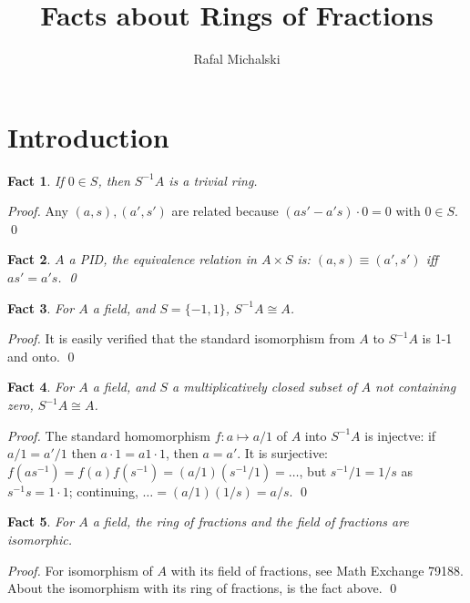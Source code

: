 \documentclass{article}
\title{Facts about Rings of Fractions}
\author{Rafal Michalski}
\date{}
\newtheorem{theorem}{Fact}[section]
\begin{document}
 

\maketitle

\section{Introduction}

\begin{theorem}
If $0 \in S$, then $S^{-1}A$ is a trivial ring.
\end{theorem}

\noindent
\textit{Proof.} Any $(a, s), (a', s')$ are related because $(as' - a's) \cdot 0 = 0$ with $0 \in S$. \qed

\begin{theorem}
$A$ a PID, the equivalence relation in $ A \times S $ is: $ (a, s) \equiv (a', s') $ iff $ as' = a's $. \qed
\end{theorem}


\vspace{2em}

\begin{theorem}
For $A$ a field, and $S = \{-1, 1\}$, $S^{-1}A \cong A$.
\end{theorem}

\noindent
\textit{Proof.} It is easily verified that the standard isomorphism from $A$ to $S^{-1}A$ is 1-1 and onto. \qed

\begin{theorem}
For $A$ a field, and $S$ a multiplicatively closed subset of $A$ not containing zero, $S^{-1}A \cong A$.
\end{theorem}

\noindent
\textit{Proof.} The standard homomorphism $f:a \mapsto a/1$ of $A$ into $S^{-1}A$ is injectve: if $a/1 = a'/1$ then $a \cdot 1 = a1 \cdot 1$, then $a = a'$. It is surjective: $f(as^{-1}) = f(a)f(s^{-1}) = (a/1)(s^{-1}/1) = \ldots$, but $s^{-1}/1 = 1/s$ as $s^{-1}s = 1 \cdot 1$; continuing, $\ldots = (a/1)(1/s) = a/s$. \qed

\begin{theorem}
For $A$ a field, the ring of fractions and the field of fractions are isomorphic.
\end{theorem}

\noindent
\textit{Proof.} For isomorphism of $A$ with its field of fractions, see Math Exchange 79188. About the isomorphism with its ring of fractions, is the fact above. \qed
\end{document}
